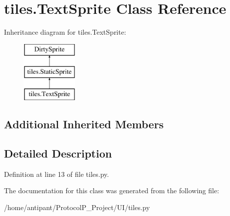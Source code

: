 \hypertarget{classtiles_1_1TextSprite}{\section{tiles.\-Text\-Sprite Class Reference}
\label{classtiles_1_1TextSprite}
}
Inheritance diagram for tiles.\-Text\-Sprite\-:\begin{figure}[H]
\begin{center}
\leavevmode
\includegraphics[height=3.000000cm]{classtiles_1_1TextSprite}
\end{center}
\end{figure}
\subsection*{Additional Inherited Members}


\subsection{Detailed Description}


Definition at line 13 of file tiles.\-py.



The documentation for this class was generated from the following file\-:\begin{DoxyCompactItemize}
\item 
/home/antipant/\-Protocol\-P\-\_\-\-Project/\-U\-I/tiles.\-py\end{DoxyCompactItemize}

